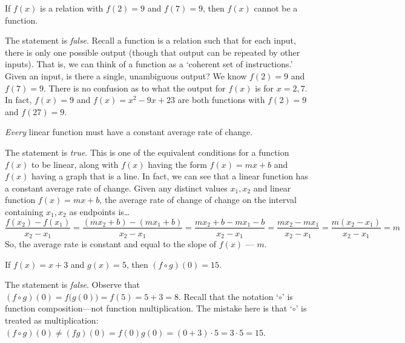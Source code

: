 \documentclass[11pt,letterpaper]{article}
\begin{document}
\thispagestyle{title}

 If $f(x)$ is a relation with $f(2)= 9$ and $f(7)= 9$, then $f(x)$ cannot be a function. \pspace

\sol The statement is \textit{false}. Recall a function is a relation such that for each input, there is only one possible output (though that output can be repeated by other inputs). That is, we can think of a function as a `coherent set of instructions.' Given an input, is there a single, unambiguous output? We know $f(2)= 9$ and $f(7)= 9$. There is no confusion as to what the output for $f(x)$ is for $x= 2, 7$. In fact, $f(x)= 9$ and $f(x)= x^2 - 9x + 23$ are both functions with $f(2)= 9$ and $f(27)= 9$. \par\vspace{1.3cm}



 \textit{Every} linear function must have a constant average rate of change. \pspace

\sol The statement is \textit{true}. This is one of the equivalent conditions for a function $f(x)$ to be linear, along with $f(x)$ having the form $f(x)= mx + b$ and $f(x)$ having a graph that is a line. In fact, we can see that a linear function has a constant average rate of change. Given any distinct values $x_1, x_2$ and linear function $f(x)= mx + b$, the average rate of change of change on the interval containing $x_1, x_2$ as endpoints is\dots
	\[
	\dfrac{f(x_2) - f(x_1)}{x_2 - x_1}= \dfrac{(mx_2 + b) - (mx_1 + b)}{x_2 - x_1}= \dfrac{mx_2 + b - mx_1 - b}{x_2 - x_1}= \dfrac{mx_2 - mx_1}{x_2 - x_1}= \dfrac{m(x_2 - x_1)}{x_2 - x_1}= m 
	\]
So, the average rate is constant and equal to the slope of $f(x)$ --- $m$. \par\vspace{1.3cm}





 If $f(x)= x + 3$ and $g(x)= 5$, then $(f \circ g)(0)= 15$. \pspace

\sol The statement is \textit{false}. Observe that $(f \circ g)(0)= f \big( g(0) \big)= f(5)= 5 + 3= 8$. Recall that the notation `$\circ$' is function composition---not function multiplication. The mistake here is that `$\circ$' is treated as multiplication: $(f \circ g)(0) \neq (fg)(0)= f(0) g(0)= (0 + 3) \cdot 5= 3 \cdot 5= 15$. \par\vspace{1.3cm}
\end{document}
